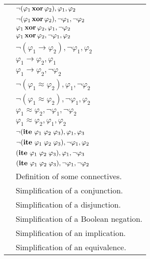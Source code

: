 \begin{xltabular}{\linewidth}{l X}
 & $ \neg (\varphi_1 \,\mathbf{xor}\, \varphi_2) , \varphi_1 , \varphi_2 $ \\
 & $ \neg (\varphi_1 \,\mathbf{xor}\, \varphi_2), \neg \varphi_1, \neg \varphi_2 $ \\
 & $ \varphi_1 \,\mathbf{xor}\, \varphi_2, \varphi_1 , \neg \varphi_2 $ \\
 & $ \varphi_1 \,\mathbf{xor}\, \varphi_2, \neg \varphi_1 , \varphi_2 $ \\
 & $ \neg (\varphi_1 \rightarrow \varphi_2), \neg \varphi_1 , \varphi_2 $ \\
 & $ \varphi_1 \rightarrow \varphi_2, \varphi_1 $ \\
 & $ \varphi_1 \rightarrow \varphi_2, \neg \varphi_2 $ \\
 & $\neg (\varphi_1 ≈ \varphi_2) , \varphi_1 , \neg \varphi_2$ \\
 & $\neg (\varphi_1 ≈ \varphi_2) , \neg \varphi_1 , \varphi_2$ \\
 & $\varphi_1 ≈ \varphi_2 , \neg \varphi_1 , \neg \varphi_2$ \\
 & $\varphi_1 ≈ \varphi_2 , \varphi_1 , \varphi_2$ \\
 & $\neg (\mathbf{ite}\ \varphi_1\;\varphi_2\;\varphi_3) , \varphi_1 , \varphi_3$ \\
 & $\neg (\mathbf{ite}\ \varphi_1\;\varphi_2\;\varphi_3) , \neg \varphi_1 , \varphi_2$ \\
 & $(\lsymb{ite}\ \varphi_1\;\varphi_2\;\varphi_3) , \varphi_1 , \neg \varphi_3$ \\
 & $(\lsymb{ite}\ \varphi_1\;\varphi_2\;\varphi_3) , \neg \varphi_1 , \neg \varphi_2$ \\
 & Definition of some connectives. \\
 & Simplification of a conjunction. \\
 & Simplification of a disjunction. \\
 & Simplification of a Boolean negation. \\
 & Simplification of an implication. \\
 & Simplification of an equivalence. \\

\end{xltabular}
